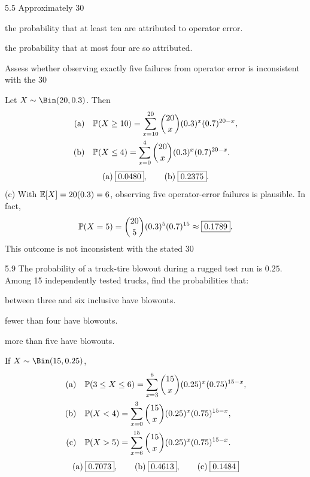 \documentclass[11pt,oneside]{article}
\begin{document}
\begin{exercise}{5.5}
Approximately 30%
\begin{exercisesubparts}
\item the probability that at least ten are attributed to operator error.
\item the probability that at most four are so attributed.
\item Assess whether observing exactly five failures from operator error is inconsistent with the 30%
\end{exercisesubparts}
\end{exercise}

\begin{solution}
Let $X\sim\Bin(20,0.3)$. Then
\begin{align*}
\textup{(a)}\quad&\mathbb{P}(X\ge10)=\sum_{x=10}^{20}\binom{20}{x}(0.3)^x(0.7)^{20-x},\\
\textup{(b)}\quad&\mathbb{P}(X\le4)=\sum_{x=0}^{4}\binom{20}{x}(0.3)^x(0.7)^{20-x}.
\end{align*}
\[\textup{(a)}\;\boxed{0.0480},\qquad \textup{(b)}\;\boxed{0.2375}.\]
\noindent\textup{(c)} With $\mathbb{E}[X]=20(0.3)=6$, observing five operator-error failures is plausible. In fact,
\[
\mathbb{P}(X=5)=\binom{20}{5}(0.3)^5(0.7)^{15}\approx\boxed{0.1789}.
\]
This outcome is not inconsistent with the stated 30%
\end{solution}

\begin{exercise}{5.9}
The probability of a truck-tire blowout during a rugged test run is $0.25$. Among 15 independently tested trucks, find the probabilities that:
\begin{exercisesubparts}
\item between three and six inclusive have blowouts.
\item fewer than four have blowouts.
\item more than five have blowouts.
\end{exercisesubparts}
\end{exercise}

\begin{solution}
If $X\sim\Bin(15,0.25)$,
\begin{align*}
\textup{(a)}\quad&\mathbb{P}(3\le X\le6)=\sum_{x=3}^{6}\binom{15}{x}(0.25)^x(0.75)^{15-x},\\
\textup{(b)}\quad&\mathbb{P}(X<4)=\sum_{x=0}^{3}\binom{15}{x}(0.25)^x(0.75)^{15-x},\\
\textup{(c)}\quad&\mathbb{P}(X>5)=\sum_{x=6}^{15}\binom{15}{x}(0.25)^x(0.75)^{15-x}.
\end{align*}
\[
\textup{(a)}\;\boxed{0.7073},\qquad \textup{(b)}\;\boxed{0.4613},\qquad \textup{(c)}\;\boxed{0.1484}
\]
\end{solution}
\end{document}
